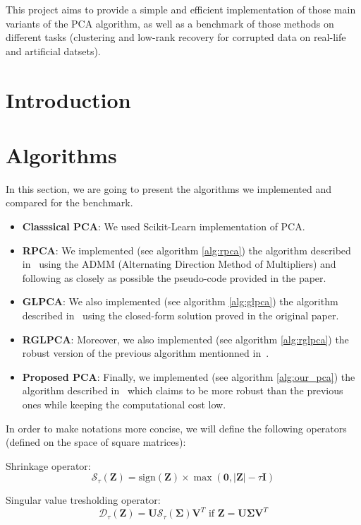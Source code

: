 \documentclass[sigconf]{acmart}
\newcommand{\sign}{\text{sign}}
\begin{document}
This project aims to provide a simple and efficient implementation of those main variants of the PCA algorithm, as well as a benchmark of those methods on different tasks (clustering and low-rank recovery for corrupted data on real-life and artificial datsets).


\section{Introduction}




\section{Algorithms}

In this section, we are going to present the algorithms we implemented and compared for the benchmark.

\begin{itemize}
  \item \textbf{Classsical PCA}: We used Scikit-Learn implementation of PCA.
  \item \textbf{RPCA}: We implemented (see algorithm \ref{alg:rpca}) the algorithm described in~\cite{rpca_paper} using the ADMM (Alternating Direction Method of Multipliers) and following as closely as possible the pseudo-code provided in the paper.
  \item \textbf{GLPCA}: We also implemented (see algorithm \ref{alg:glpca}) the algorithm described in~\cite{glpca_paper} using the closed-form solution proved in the original paper.
  \item \textbf{RGLPCA}: Moreover, we also implemented (see algorithm \ref{alg:rglpca}) the robust version of the previous algorithm mentionned in~\cite{glpca_paper}.
  \item \textbf{Proposed PCA}: Finally, we implemented (see algorithm \ref{alg:our_pca}) the algorithm described in~\cite{main_paper} which claims to be more robust than the previous ones while keeping the computational cost low.
\end{itemize}
 
In order to make notations more concise, we will define the following operators (defined on the space of square matrices):

Shrinkage operator:
\[ \mathcal{S}_{\tau}(\mathbf{Z}) = \sign{(\mathbf{Z})} \times \max{(\mathbf{0}, |\mathbf{Z}| - \tau \mathbf{I})} \]

Singular value tresholding operator:
\[ \mathcal{D}_{\tau}(\mathbf{Z}) = \mathbf{U} \mathcal{S}_{\tau}(\mathbf{\Sigma}) \mathbf{V}^T \text{ if } \mathbf{Z} = \mathbf{U} \mathbf{\Sigma} \mathbf{V}^T \]
\end{document}
